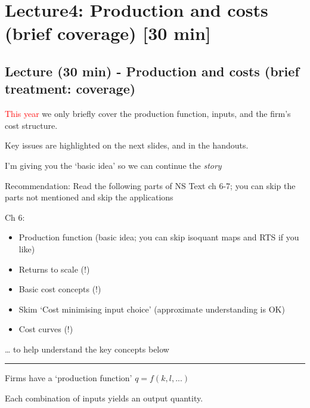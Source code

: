 \documentclass[]{article}
\begin{document}
\hypertarget{lecture4-production-and-costs-brief-coverage-30-min}{%
\section{Lecture4: Production and costs (brief coverage) {[}30 min{]}}\label{lecture4-production-and-costs-brief-coverage-30-min}}

\hypertarget{lecture-30-min---production-and-costs-brief-treatment-coverage}{%
\subsection{Lecture (30 min) - Production and costs (brief treatment: coverage)}\label{lecture-30-min---production-and-costs-brief-treatment-coverage}}

\textcolor{red}{This year} we only briefly cover the production function, inputs, and the firm's cost structure.

\bigskip

Key issues are highlighted on the next slides, and in the handouts.

I'm giving you the `basic idea' so we can continue the \emph{story}

\bigskip

Recommendation: Read the following parts of NS Text ch 6-7; you can skip the parts not mentioned and skip the applications

Ch 6:

\begin{itemize}
\item
  Production function (basic idea; you can skip isoquant maps and RTS if you like)
\item
  Returns to scale (!)
\item
  Basic cost concepts (!)
\item
  Skim `Cost minimising input choice' (approximate understanding is OK)
\item
  Cost curves (!)
\end{itemize}

\ldots{} to help understand the key concepts below

\begin{center}\rule{0.5\linewidth}{\linethickness}\end{center}

Firms have a `production function' \(q = f(k,l,...)\)

Each combination of inputs yields an output quantity.

\bigskip
\end{document}

